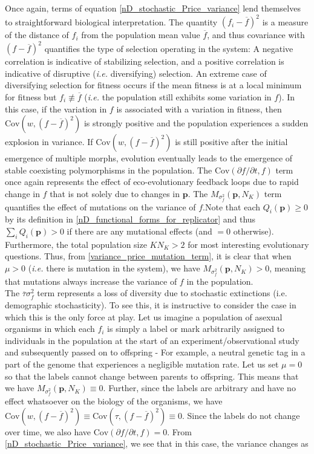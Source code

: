 Once again, terms of equation \eqref{nD_stochastic_Price_variance} lend themselves to straightforward biological interpretation. The quantity $(f_i-\overline{f})^2$ is a measure of the distance of $f_i$ from the population mean value $\overline{f}$, and thus covariance with $(f-\overline{f})^2$ quantifies the type of selection operating in the system: A negative correlation is indicative of stabilizing selection, and a positive correlation is indicative of disruptive (\emph{i.e.} diversifying) selection. An extreme case of diversifying selection for fitness occurs if the mean fitness is at a local minimum for fitness but $f_i \not\equiv \overline{f}$ (\emph{i.e.} the population still exhibits some variation in $f$). In this case, if the variation in $f$ is associated with a variation in fitness, then $\textrm{Cov}(w,(f - \overline{f})^2)$ is strongly positive and the population experiences a sudden explosion in variance. If $\textrm{Cov}(w,(f - \overline{f})^2)$ is still positive after the initial emergence of multiple morphs, evolution eventually leads to the emergence of stable coexisting polymorphisms in the population. The $\textrm{Cov}\left(\partial f/\partial t,f\right)$ term once again represents the effect of eco-evolutionary feedback loops due to rapid change in $f$ that is not solely due to changes in $\mathbf{p}$. The $M_{\sigma^2_f}(\mathbf{p},N_K)$ term quantifies the effect of mutations on the variance of $f$.Note that each $Q_i(\mathbf{p}) \geq 0$ by its definition in \eqref{nD_functional_forms_for_replicator} and thus $\sum_i Q_i(\mathbf{p}) > 0$ if there are any mutational effects (and $=0$ otherwise). Furthermore, the total population size $KN_K > 2$ for most interesting evolutionary questions. Thus, from \eqref{variance_price_mutation_term}, it is clear that when $\mu > 0$ (\emph{i.e.} there is mutation in the system), we have $M_{\sigma^2_f}(\mathbf{p},N_K) > 0$, meaning that mutations always increase the variance of $f$ in the population.\\
The $\overline{\tau}\sigma^2_{f}$ term represents a loss of diversity due to stochastic extinctions (i.e. demographic stochasticity). To see this, it is instructive to consider the case in which this is the only force at play. Let us imagine a population of asexual organisms in which each $f_i$ is simply a label or mark arbitrarily assigned to individuals in the population at the start of an experiment/observational study and subsequently passed on to offspring - For example, a neutral genetic tag in a part of the genome that experiences a negligible mutation rate. Let us set $\mu = 0$ so that the labels cannot change between parents to offspring. This means that we have $M_{\sigma^2_f}(\mathbf{p},N_K) \equiv 0$. Further, since the labels are arbitrary and have no effect whatsoever on the biology of the organisms, we have $\textrm{Cov}\left(w,(f - \overline{f})^2\right) \equiv \textrm{Cov}\left(\tau,(f - \overline{f})^2\right) \equiv 0$. Since the labels do not change over time, we also have $\textrm{Cov}\left(\partial f/\partial t,f\right) = 0$. From \eqref{nD_stochastic_Price_variance}, we see that in this case, the variance changes as
